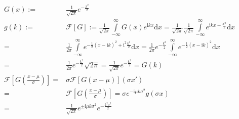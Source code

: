 \documentclass[10pt,a4paper]{article}
\begin{document}
\begin{align}
G(x) := & \frac{1}{\sqrt{2\pi}} e^{ -\frac{ x^2 }{2} } \\
g(k) := & \mathcal{F}\left[ G \right]
   :=   \frac{1}{\sqrt{2\pi}}
        \int\limits_{-\infty}^{\infty} G(x) e^{\mathrm{i} k x} \mathrm{d}x
    =   \frac{1}{\sqrt{2\pi}} \frac{1}{\sqrt{2\pi}}
        \int\limits_{-\infty}^{\infty} e^{\mathrm{i} k x - \frac{ x^2 }{2} }
        \mathrm{d}x \\
    = & \frac{1}{2\pi} \int\limits_{-\infty}^{\infty}
        e^{ - \frac{1}{2} \left( x - \mathrm{i} k \right)^2 +
            \mathrm{i}^2 \frac{ k^2 }{2} } \mathrm{d}x
    =   \frac{1}{2\pi} e^{ - \frac{ k^2 }{2} } \int\limits_{-\infty}^{\infty}
        e^{ - \frac{1}{2} \left( x - \mathrm{i} k \right)^2 } \mathrm{d}x \\
    = & \frac{1}{2\pi} e^{ - \frac{ k^2 }{2} } \sqrt{2\pi}
    =   \frac{1}{ \sqrt{2\pi} } e^{ - \frac{ k^2 }{2} }
    =   G(k) \\
\mathcal{F}\left[G\left( \frac{x-\mu}{\sigma} \right) \right]
    = & \sigma \mathcal{F}\left[G\left( x-\mu \right)\right]\left( \sigma x' \right) \\
    = & \mathcal{F} \left[G\left( \frac{x-\mu}{\sigma} \right) \right]
    =   \sigma e^{ -\mathrm{i} \mu k \sigma^2 } g\left( \sigma x \right) \\
    = & \frac{1}{ \sqrt{2\pi} }
        e^{ \pm \mathrm{i} \mu k \sigma^2  }
        e^{ -\frac{ k^2\sigma^2 }{ 2 } }
\end{align}
\end{document}
